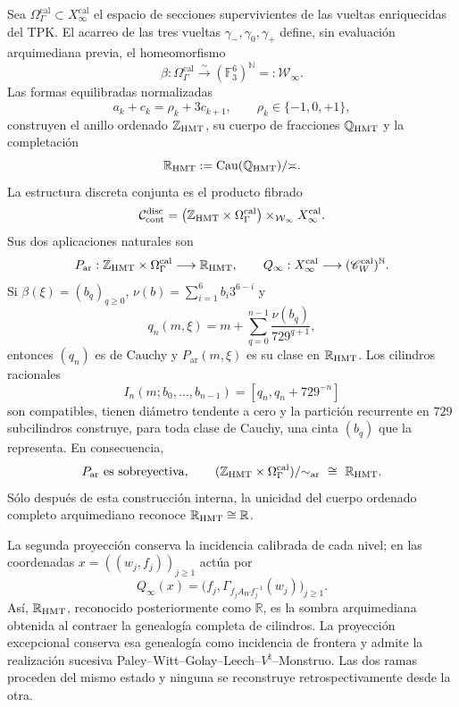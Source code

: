 \begin{theorem}
\label{thm:c27-tesis-rectora-doble-proyeccion}
Sea \(\Omega_\Gamma^{\mathrm{cal}}\subset
X_\infty^{\mathrm{cal}}\) el espacio de secciones supervivientes de las
vueltas enriquecidas del TPK. El acarreo de las tres vueltas
\(\gamma_-,\gamma_0,\gamma_+\) define, sin evaluación arquimediana previa,
el homeomorfismo
\[
 \beta:\Omega_\Gamma^{\mathrm{cal}}\xrightarrow{\ \sim\ }
 (\mathbb F_3^6)^{\mathbb N}=: \mathcal W_\infty.
\]
Las formas equilibradas normalizadas
\[
 a_k+c_k=\rho_k+3c_{k+1},\qquad
 \rho_k\in\{-1,0,+1\},
\]
construyen el anillo ordenado \(\mathbb Z_{\rm HMT}\), su cuerpo de
fracciones \(\mathbb Q_{\rm HMT}\) y la completación
\[
 \mathbb R_{\rm HMT}:=
 \operatorname{Cau}(\mathbb Q_{\rm HMT})/{\asymp}.
\]
La estructura discreta conjunta es el producto fibrado
\[
\mathcal C_{\mathrm{cont}}^{\mathrm{disc}}
=\bigl(\mathbb Z_{\rm HMT}\times
\Omega_\Gamma^{\mathrm{cal}}\bigr)
\times_{\mathcal W_\infty}X_\infty^{\mathrm{cal}}.
\]
Sus dos aplicaciones naturales son
\[
 P_{\mathrm{ar}}:\mathbb Z_{\rm HMT}\times
 \Omega_\Gamma^{\mathrm{cal}}\longrightarrow\mathbb R_{\rm HMT},
 \qquad
 Q_\infty:X_\infty^{\mathrm{cal}}\longrightarrow
 (\mathscr C_W^{\mathrm{cal}})^{\mathbb N}.
\]
Si \(\beta(\xi)=(b_q)_{q\geq0}\),
\(\nu(b)=\sum_{i=1}^{6}b_i3^{6-i}\) y
\[
 q_n(m,\xi)=m+\sum_{q=0}^{n-1}
 \frac{\nu(b_q)}{729^{q+1}},
\]
entonces \((q_n)\) es de Cauchy y \(P_{\mathrm{ar}}(m,\xi)\) es su clase
en \(\mathbb R_{\rm HMT}\). Los cilindros racionales
\[
 I_n(m;b_0,\ldots,b_{n-1})=
 \left[q_n,q_n+729^{-n}\right]
\]
son compatibles, tienen diámetro tendente a cero y la partición recurrente
en \(729\) subcilindros construye, para toda clase de Cauchy, una cinta
\((b_q)\) que la representa. En consecuencia,
\[
 P_{\mathrm{ar}}\ \text{es sobreyectiva},\qquad
 (\mathbb Z_{\rm HMT}\times\Omega_\Gamma^{\mathrm{cal}})
 /{\sim_{\rm ar}}\ \cong\ \mathbb R_{\rm HMT}.
\]
Sólo después de esta construcción interna, la unicidad del cuerpo ordenado
completo arquimediano reconoce \(\mathbb R_{\rm HMT}\cong\mathbb R\).

La segunda proyección conserva la incidencia calibrada de cada nivel; en las
coordenadas \(x=((w_j,f_j))_{j\geq1}\) actúa por
\[
 Q_\infty(x)
 =\bigl(f_j,\Gamma_{f_jA_Wf_j^{-1}}(w_j)\bigr)_{j\geq1}.
\]
Así, \(\mathbb R_{\rm HMT}\), reconocido posteriormente como \(\mathbb R\),
es la sombra arquimediana obtenida al contraer la genealogía completa de
cilindros. La proyección excepcional conserva esa genealogía como incidencia
de frontera y admite la realización sucesiva
Paley--Witt--Golay--Leech--\(V^\natural\)--Monstruo. Las dos ramas proceden
del mismo estado y ninguna se reconstruye retrospectivamente desde la otra.
\end{theorem}

